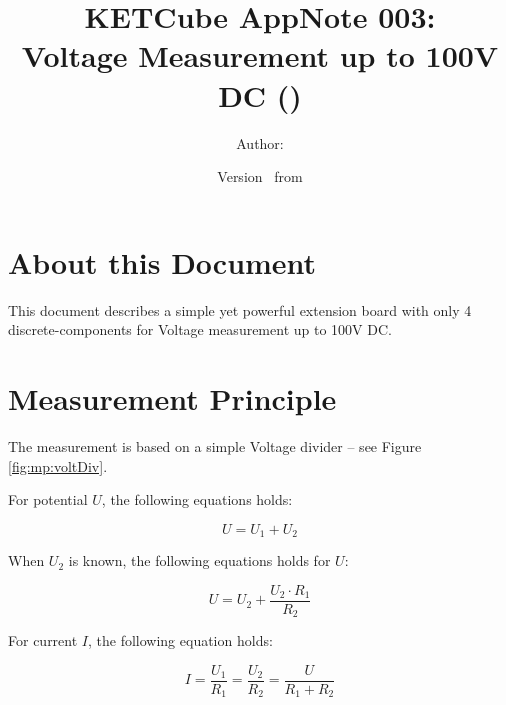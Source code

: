\documentclass[twoside,a4paper]{refart}
\title{\UWBLogo KETCube AppNote 003:\\ Voltage Measurement up to 100V DC (\vhCurrentVersion)}
\author{Author: \vhListAllAuthorsLongWithAbbrev}
\date{Version \vhCurrentVersion\ from \vhCurrentDate}
\begin{document}

\titlepage
\maketitle

\section*{About this Document}


This document describes a simple yet powerful extension board with only 4 discrete-components for Voltage measurement up to 100V DC.


\setcounter{tocdepth}{1}
\tableofcontents
\clearpage

\listoffigures
\listoftables
\begin{versionhistory}
\end{versionhistory}
\setcounter{table}{0}

\clearpage 
{} 
\pagestyle{headings} 

\clearpage
\section{Measurement Principle}
The measurement is based on a simple Voltage divider -- see Figure \ref{fig:mp:voltDiv}.


For potential $U$, the following equations holds:

\begin{equation}
U = U_1 + U_2
\end{equation}

When $U_2$ is known, the following equations holds for $U$:

\begin{equation}
U = U_2 + \frac{U_2 \cdot R_1}{R_2}
\end{equation}



For current $I$, the following equation holds:

\begin{equation}
I = \frac{U_1}{R_1} = \frac{U_2}{R_2} = \frac{U}{R_1 + R_2}
\end{equation}
\end{document}
